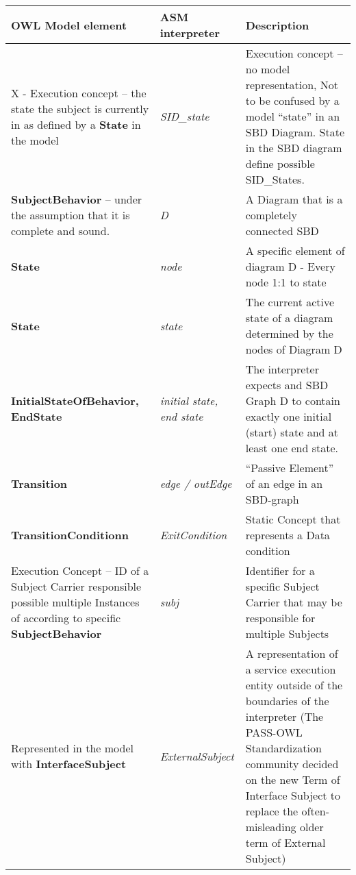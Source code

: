 \begin{landscape}
	\begin {longtable} {| p{} | p{} | p{}|}
	\hline
	OWL Model element &   ASM interpreter & Description\\
	\toprule
	\endhead
	\hline
	
	X - Execution concept – the state the subject is currently in as defined by a \textbf{State} in the model 
	& \textit{SID\_state} 
	&  Execution concept – no model representation, Not to be confused by a model “state” in an SBD Diagram. State in the SBD diagram define possible SID\_States.
	\\
	\hline
	
	\textbf{SubjectBehavior }	– under the assumption that it is complete and sound.
	& \textit{D} 
	&  A Diagram that is a completely connected SBD
	\\
	\hline
	
	\textbf{State}
	& \textit{node} 
	&  A specific element of diagram D -	Every node 1:1 to state
	\\
	\hline
	
	\textbf{State}
	& \textit{state} 
	& The current active state of a diagram determined by the nodes of Diagram D
	\\
	\hline
	
	\textbf{InitialStateOfBehavior, \newline EndState }
	& \textit{initial state, \newline end state} 
	& The interpreter expects and SBD Graph D to contain exactly one initial (start) state and at least one end state.
	\\
	\hline
	
	\textbf{Transition}
	& \textit{edge / outEdge} 
	& “Passive Element” of an edge in an SBD-graph
	\\
	\hline
	
	\textbf{TransitionConditionn}
	& \textit{ExitCondition} 
	& Static Concept that represents a Data condition
	\\
	\hline
	
	Execution Concept – ID of a Subject Carrier responsible possible multiple Instances of according to specific  \textbf{SubjectBehavior}
	& \textit{subj} 
	& Identifier for a specific Subject Carrier that may be responsible for multiple Subjects
	\\
	\hline
	
	Represented in the model with \textbf{InterfaceSubject}
	& \textit{ExternalSubject} 
	& A representation of a service execution entity outside of the boundaries of the interpreter
	(The PASS-OWL Standardization community decided on the new Term of Interface Subject to replace the often-misleading older term of External Subject)
	

\end{longtable}
\end{landscape}
